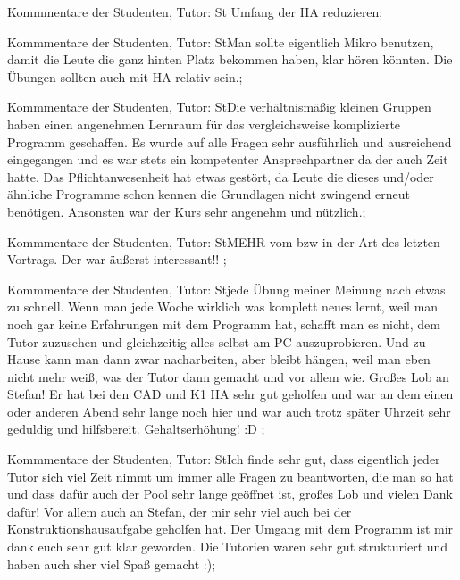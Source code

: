 \documentclass[10pt]{beamer}
\begin{document}
\begin{frame}[fragile]{Kommmentare der Studenten, Tutor: St}  Umfang der HA reduzieren;
 \end{frame}
\begin{frame}[fragile]{Kommmentare der Studenten, Tutor: St}Man sollte eigentlich Mikro benutzen, damit die Leute die ganz hinten Platz bekommen haben, klar hören könnten. Die Übungen sollten auch mit HA relativ sein.;
 \end{frame}
\begin{frame}[fragile]{Kommmentare der Studenten, Tutor: St}Die verhältnismäßig kleinen Gruppen  haben einen angenehmen Lernraum für das vergleichsweise komplizierte Programm geschaffen. Es wurde auf alle Fragen sehr ausführlich und ausreichend eingegangen und es war stets ein kompetenter Ansprechpartner da der auch Zeit hatte. Das Pflichtanwesenheit hat etwas gestört, da Leute die dieses und/oder ähnliche Programme schon kennen die Grundlagen nicht zwingend erneut benötigen. Ansonsten war der Kurs sehr angenehm und nützlich.;
 \end{frame}
\begin{frame}[fragile]{Kommmentare der Studenten, Tutor: St}MEHR vom bzw in der Art des letzten Vortrags. Der war äußerst interessant!! ;
 \end{frame}
\begin{frame}[fragile]{Kommmentare der Studenten, Tutor: St}jede Übung meiner Meinung nach etwas zu schnell. Wenn man jede Woche wirklich was komplett neues lernt, weil man noch gar keine Erfahrungen mit dem Programm hat, schafft man es nicht, dem Tutor zuzusehen und gleichzeitig alles selbst am PC auszuprobieren. Und zu Hause kann man dann zwar nacharbeiten, aber bleibt hängen, weil man eben nicht mehr weiß, was der Tutor dann gemacht und vor allem wie.  Großes Lob an Stefan! Er hat bei den CAD und K1 HA sehr gut geholfen und war an dem einen oder anderen Abend sehr lange noch hier und war auch trotz später Uhrzeit sehr geduldig und hilfsbereit.  Gehaltserhöhung! :D ;
 \end{frame}
\begin{frame}[fragile]{Kommmentare der Studenten, Tutor: St}Ich finde sehr gut, dass eigentlich jeder Tutor sich viel Zeit nimmt um immer alle Fragen zu beantworten, die man so hat und dass dafür auch der Pool sehr lange geöffnet ist, großes Lob und vielen Dank dafür! Vor allem auch an Stefan, der mir sehr viel auch bei der Konstruktionshausaufgabe geholfen hat.  Der Umgang mit dem Programm ist mir dank euch sehr gut klar geworden. Die Tutorien waren sehr gut strukturiert und haben auch sher viel Spaß gemacht :);
 \end{frame}
\end{document}
